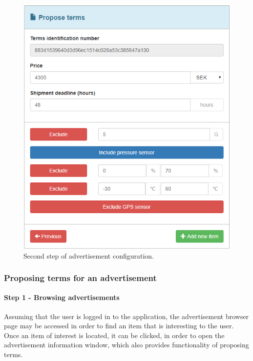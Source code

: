 \begin{figure}[H]
\centering
\includegraphics[scale=0.48]{app_screens/new_item_2.png}
\caption{Second step of advertisement configuration.}
\label{fig:newitem2}
\end{figure}

\subsubsection{Proposing terms for an advertisement}

\paragraph{Step 1 - Browsing advertisements}
Assuming that the user is logged in to the application, the advertisement browser page may be accessed in order to find an item that is interesting to the user. Once an item of interest is located, it can be clicked, in order to open the advertisement information window, which also provides functionality of proposing terms.


